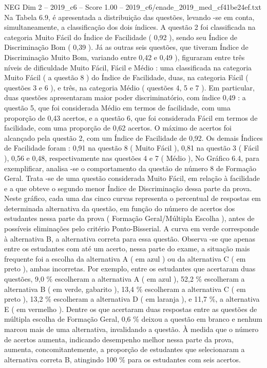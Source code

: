 \begin{textsample}{NEG Dim 2 – 2019\_c6 – Score 1.00 – 2019\_c6/enade\_2019\_med\_cf41be24ef.txt}
Na Tabela 6.9, é apresentada a distribuição das questões, levando -se em conta, simultaneamente, a classificação dos dois índices.
A questão 2 foi classificada na categoria Muito Fácil do Índice de Facilidade ( 0,92 ), sendo seu Índice de Discriminação Bom ( 0,39 ).
Já as outras seis questões, que tiveram Índice de Discriminação Muito Bom, variando entre 0,42 e 0,49 ), figuraram entre três níveis de dificuldade Muito Fácil, Fácil e Médio : uma classificada na categoria Muito Fácil ( a questão 8 ) do Índice de Facilidade, duas, na categoria Fácil ( questões 3 e 6 ), e três, na categoria Médio ( questões 4, 5 e 7 ).
Em particular, duas questões apresentaram maior poder discriminatório, com índice 0,49 : a questão 5, que foi considerada Médio em termos de facilidade, com uma proporção de 0,43 acertos, e a questão 6, que foi considerada Fácil em termos de facilidade, com uma proporção de 0,62 acertos.
O máximo de acertos foi alcançado pela questão 2, com um Índice de Facilidade de 0,92.
Os demais Índices de Facilidade foram : 0,91 na questão 8 ( Muito Fácil ), 0,81 na questão 3 ( Fácil ), 0,56 e 0,48, respectivamente nas questões 4 e 7 ( Médio ), No Gráfico 6.4, para exemplificar, analisa -se o comportamento da questão de número 8 de Formação Geral.
Trata -se de uma questão considerada Muito Fácil, em relação à facilidade e a que obteve o segundo menor Índice de Discriminação dessa parte da prova.
Neste gráfico, cada uma das cinco curvas representa o percentual de respostas em determinada alternativa da questão, em função do número de acertos dos estudantes nessa parte da prova ( Formação Geral/Múltipla Escolha ), antes de possíveis eliminações pelo critério Ponto-Bisserial.
A curva em verde corresponde à alternativa B, a alternativa correta para essa questão.
Observa -se que apenas entre os estudantes com até um acerto, nessa parte do exame, a situação mais frequente foi a escolha da alternativa A ( em azul ) ou da alternativa C ( em preto ), ambas incorretas.
Por exemplo, entre os estudantes que acertaram duas questões, 9,0 \% escolheram a alternativa A ( em azul ), 52,2 \% escolheram a alternativa B ( em verde, gabarito ), 13,4 \% escolheram a alternativa C ( em preto ), 13,2 \% escolheram a alternativa D ( em laranja ), e 11,7 \%, a alternativa E ( em vermelho ).
Dentre os que acertaram duas respostas entre as questões de múltipla escolha de Formação Geral, 0,6 \% deixou a questão em branco e nenhum marcou mais de uma alternativa, invalidando a questão.
À medida que o número de acertos aumenta, indicando desempenho melhor nessa parte da prova, aumenta, concomitantemente, a proporção de estudantes que selecionaram a alternativa correta B, atingindo 100 \% para os estudantes com seis acertos.

\end{textsample}

